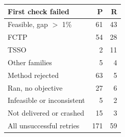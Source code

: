 \begin{tabular}{lrr}
\toprule
First check failed & P & R \\
\midrule
Feasible, gap $>$ 1\% & 61 & 43 \\
\quad FCTP & 54 & 28 \\
\quad TSSO & 2 & 11 \\
\quad Other families & 5 & 4 \\
Method rejected & 63 & 5 \\
Ran, no objective & 27 & 6 \\
Infeasible or inconsistent & 5 & 2 \\
Not delivered or crashed & 15 & 3 \\
\midrule
All unsuccessful retries & 171 & 59 \\
\bottomrule
\end{tabular}

